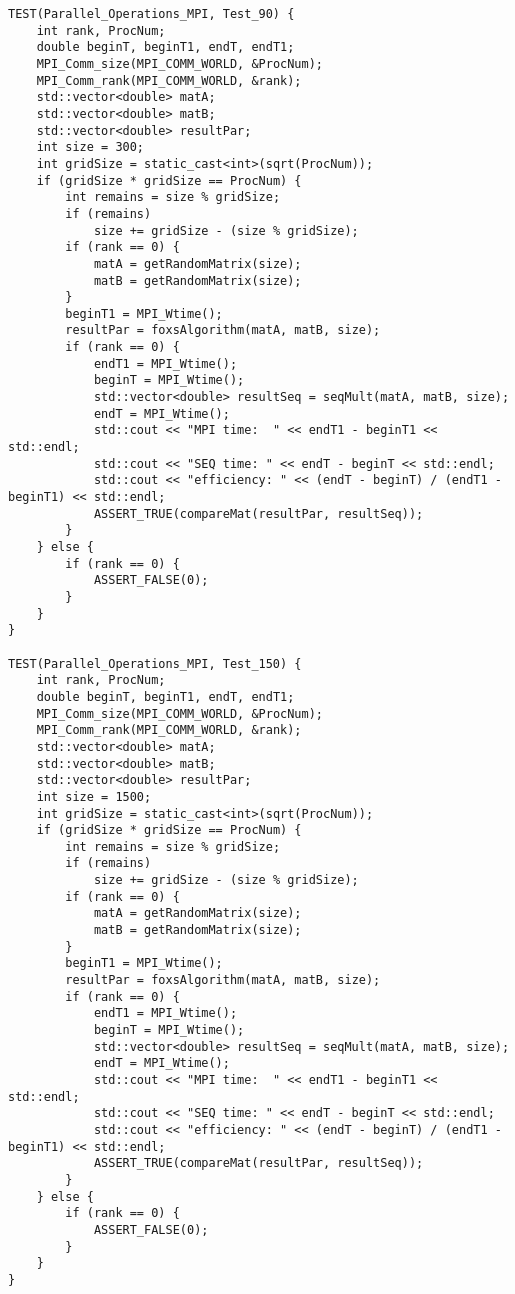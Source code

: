 \documentclass{report}
\begin{document}
\begin{lstlisting}
TEST(Parallel_Operations_MPI, Test_90) {
    int rank, ProcNum;
    double beginT, beginT1, endT, endT1;
    MPI_Comm_size(MPI_COMM_WORLD, &ProcNum);
    MPI_Comm_rank(MPI_COMM_WORLD, &rank);
    std::vector<double> matA;
    std::vector<double> matB;
    std::vector<double> resultPar;
    int size = 300;
    int gridSize = static_cast<int>(sqrt(ProcNum));
    if (gridSize * gridSize == ProcNum) {
        int remains = size % gridSize;
        if (remains)
            size += gridSize - (size % gridSize);
        if (rank == 0) {
            matA = getRandomMatrix(size);
            matB = getRandomMatrix(size);
        }
        beginT1 = MPI_Wtime();
        resultPar = foxsAlgorithm(matA, matB, size);
        if (rank == 0) {
            endT1 = MPI_Wtime();
            beginT = MPI_Wtime();
            std::vector<double> resultSeq = seqMult(matA, matB, size);
            endT = MPI_Wtime();
            std::cout << "MPI time:  " << endT1 - beginT1 << std::endl;
            std::cout << "SEQ time: " << endT - beginT << std::endl;
            std::cout << "efficiency: " << (endT - beginT) / (endT1 - beginT1) << std::endl;
            ASSERT_TRUE(compareMat(resultPar, resultSeq));
        }
    } else {
        if (rank == 0) {
            ASSERT_FALSE(0);
        }
    }
}

TEST(Parallel_Operations_MPI, Test_150) {
    int rank, ProcNum;
    double beginT, beginT1, endT, endT1;
    MPI_Comm_size(MPI_COMM_WORLD, &ProcNum);
    MPI_Comm_rank(MPI_COMM_WORLD, &rank);
    std::vector<double> matA;
    std::vector<double> matB;
    std::vector<double> resultPar;
    int size = 1500;
    int gridSize = static_cast<int>(sqrt(ProcNum));
    if (gridSize * gridSize == ProcNum) {
        int remains = size % gridSize;
        if (remains)
            size += gridSize - (size % gridSize);
        if (rank == 0) {
            matA = getRandomMatrix(size);
            matB = getRandomMatrix(size);
        }
        beginT1 = MPI_Wtime();
        resultPar = foxsAlgorithm(matA, matB, size);
        if (rank == 0) {
            endT1 = MPI_Wtime();
            beginT = MPI_Wtime();
            std::vector<double> resultSeq = seqMult(matA, matB, size);
            endT = MPI_Wtime();
            std::cout << "MPI time:  " << endT1 - beginT1 << std::endl;
            std::cout << "SEQ time: " << endT - beginT << std::endl;
            std::cout << "efficiency: " << (endT - beginT) / (endT1 - beginT1) << std::endl;
            ASSERT_TRUE(compareMat(resultPar, resultSeq));
        }
    } else {
        if (rank == 0) {
            ASSERT_FALSE(0);
        }
    }
}


\end{lstlisting}
\end{document}
